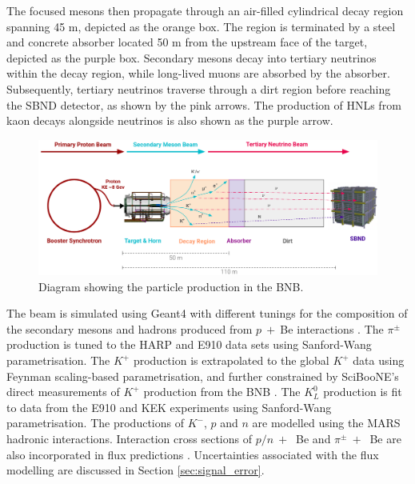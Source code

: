 The focused mesons then propagate through an air-filled cylindrical decay region spanning 45 m, depicted as the orange box.
The region is terminated by a steel and concrete absorber located 50 m from the upstream face of the target, depicted as the purple box.
Secondary mesons decay into tertiary neutrinos within the decay region, while long-lived muons are absorbed by the absorber. 
Subsequently, tertiary neutrinos traverse through a dirt region before reaching the SBND detector, as shown by the pink arrows.
The production of HNLs from kaon decays alongside neutrinos is also shown as the purple arrow.

\begin{figure}[hb!] 
\centering    
\includegraphics[width=1.0\textwidth]{BNBDiagram}
\caption[Particle Production in the Booster Neutrino Beam]{
Diagram showing the particle production in the BNB.
}
\label{fig:BNBDiagram}
\end{figure}

The beam is simulated using Geant4 \cite{geant4} with different tunings for the composition of the secondary mesons and hadrons produced from $p\ +\ $Be interactions \cite{BNBMiniBooNE}.
The $\pi^{\pm}$ production is tuned to the HARP and E910 data sets using Sanford-Wang parametrisation.
The $K^{+}$ production is extrapolated to the global $K^{+}$ data using Feynman scaling-based parametrisation, and further constrained by SciBooNE's direct measurements of $K^{+}$ production from the BNB \cite{SciBooNE}. 
The $K^0_L$ production is fit to data from the E910 and KEK experiments using Sanford-Wang parametrisation.
The productions of $K^{-}$, $p$ and $n$ are modelled using the MARS hadronic interactions.
Interaction cross sections of $p/n\ +\ $ Be and $\pi^{\pm}\ +\ $ Be are also incorporated in flux predictions \cite{DavePhd}.
Uncertainties associated with the flux modelling are discussed in Section \ref{sec:signal_error}.

